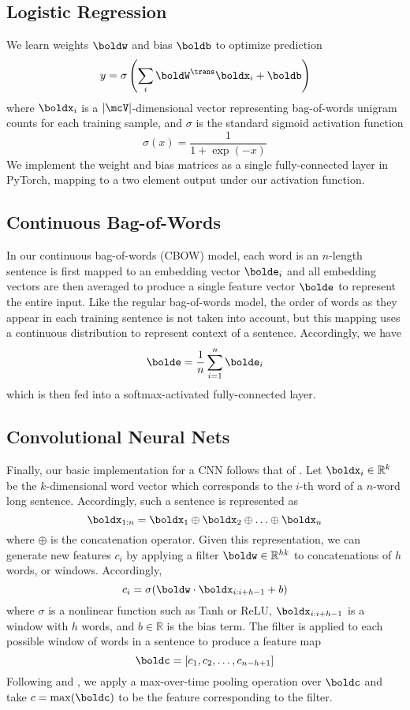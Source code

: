 \documentclass[11pt]{article}
\begin{document}
\subsection{Logistic Regression}
We learn weights $\boldw$ and bias $\boldb$ to optimize prediction
\[
y = \sigma\left( \sum_i\boldW^\trans \boldx_i + \boldb\right)
\]
where $\boldx_i$ is a $|\mcV|$-dimensional vector representing bag-of-words unigram counts for each training sample, and $\sigma$ is the standard sigmoid activation function
\[
\sigma(x) = \frac{1}{1 + \exp(-x)} 
\]
We implement the weight and bias matrices as a single fully-connected layer in PyTorch, mapping to a two element output under our activation function.

\subsection{Continuous Bag-of-Words}
In our continuous bag-of-words (CBOW) model, each word is an $n$-length sentence is first mapped to an embedding vector $\bolde_i$ and all embedding vectors are then averaged to produce a single feature vector $\bolde$ to represent the entire input. Like the regular bag-of-words model, the order of words as they appear in each training sentence is not taken into account, but this mapping uses a continuous distribution to represent context of a sentence. Accordingly, we have 
\[
\bolde = \frac{1}{n}\sum_{i=1}^n \bolde_i
\]
which is then fed into a softmax-activated fully-connected layer.  

\subsection{Convolutional Neural Nets} 
Finally, our basic implementation for a CNN follows that of \citet{DBLP:journals/corr/Kim14f}. Let $\boldx_i \in \mathbb{R}^k$ be the $k$-dimensional word vector which corresponds to the $i$-th word of a $n$-word long sentence. Accordingly, such a sentence is represented as
\[
\boldx_{1:n} = \boldx_1 \oplus \boldx_2 \oplus  \ldots \oplus \boldx_n
\]
where $\oplus$ is the concatenation operator. Given this representation, we can generate new features $c_i$ by applying a filter $\boldw \in \mathbb{R}^{hk}$ to concatenations of $h$ words, or windows. Accordingly,
\[
c_i = \sigma(\boldw \cdot \boldx_{i: i + h - 1} + b)
\]
where $\sigma$ is a nonlinear function such as Tanh or ReLU, $\boldx_{i: i + h - 1}$ is a window with $h$ words, and $b \in \mathbb{R}$ is the bias term. The filter is applied to each possible window of words in a sentence to produce a feature map
\[
\boldc = [c_1, c_2, \ldots, c_{n - h + 1}]
\]
Following \citet{collobert2011natural} and \citet{DBLP:journals/corr/Kim14f}, we apply a max-over-time pooling operation over $\boldc$ and take $c = \max(\boldc)$ to be the feature corresponding to the filter.
\end{document}
